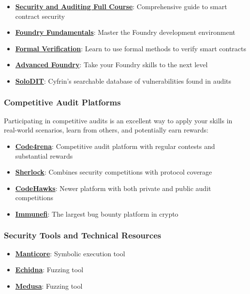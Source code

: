 \documentclass[12pt]{article}
\begin{document}
\begin{itemize}
    \item \textbf{\href{https://updraft.cyfrin.io/courses/security}{Security and Auditing Full Course}}: Comprehensive guide to smart contract security
    \item \textbf{\href{https://updraft.cyfrin.io/courses/foundry}{Foundry Fundamentals}}: Master the Foundry development environment
    \item \textbf{\href{https://updraft.cyfrin.io/courses/formal-verification}{Formal Verification}}: Learn to use formal methods to verify smart contracts
    \item \textbf{\href{https://updraft.cyfrin.io/courses/advanced-foundry}{Advanced Foundry}}: Take your Foundry skills to the next level
    \item \textbf{\href{https://solodit.cyfrin.io/}{SoloDIT}}: Cyfrin's searchable database of vulnerabilities found in audits
\end{itemize}

\subsubsection*{Competitive Audit Platforms}

Participating in competitive audits is an excellent way to apply your skills in
real-world scenarios, learn from others, and potentially earn rewards:

\begin{itemize}
    \item \textbf{\href{https://code4rena.com/}{Code4rena}}: Competitive audit platform with regular contests and substantial rewards
    \item \textbf{\href{https://www.sherlock.xyz/}{Sherlock}}: Combines security competitions with protocol coverage
    \item \textbf{\href{https://codehawks.cyfrin.io/}{CodeHawks}}: Newer platform with both private and public audit competitions
    \item \textbf{\href{https://immunefi.com/}{Immunefi}}: The largest bug bounty platform in crypto
\end{itemize}

\subsubsection*{Security Tools and Technical Resources}

\begin{itemize}
    \item \textbf{\href{https://github.com/trailofbits/manticore}{Manticore}}: Symbolic execution tool
    \item \textbf{\href{https://github.com/crytic/echidna}{Echidna}}: Fuzzing tool
    \item \textbf{\href{https://github.com/crytic/medusa}{Medusa}}: Fuzzing tool
\end{itemize}
\end{document}
